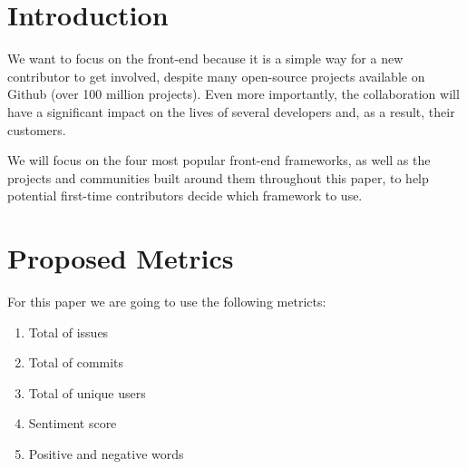 \section{Introduction}

We want to focus on the front-end because it is a simple way for a new contributor to get involved, despite many open-source projects available on Github (over 100 million projects\cite{intro}). Even more importantly, the collaboration will have a significant impact on the lives of several developers and, as a result, their customers.

We will focus on the four most popular front-end frameworks, as well as the projects and communities built around them throughout this paper, to help potential first-time contributors decide which framework to use.

\section{Proposed Metrics}
For this paper we are going to use the following metricts:
\begin{enumerate}
    \item Total of issues
    \item Total of commits
    \item Total of unique users
    \item Sentiment score  
    \item Positive and negative words
\end{enumerate}

\pagebreak